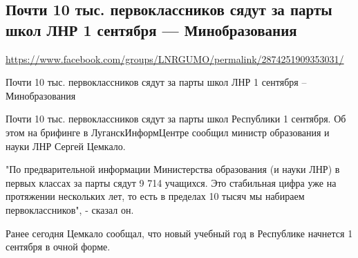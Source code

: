  
 
\subsection{Почти 10 тыс. первоклассников сядут за парты школ ЛНР 1 сентября --- Минобразования}
\label{sec:24_07_2020.fb.lnr.2}
\url{https://www.facebook.com/groups/LNRGUMO/permalink/2874251909353031/}

Почти 10 тыс. первоклассников сядут за парты школ ЛНР 1 сентября –
Минобразования

Почти 10 тыс. первоклассников сядут за парты школ Республики 1 сентября. Об
этом на брифинге в ЛуганскИнформЦентре сообщил министр образования и науки ЛНР
Сергей Цемкало.

"По предварительной информации Министерства образования (и науки ЛНР) в первых
классах за парты сядут 9 714 учащихся. Это стабильная цифра уже на протяжении
нескольких лет, то есть в пределах 10 тысяч мы набираем первоклассников", -
сказал он.

Ранее сегодня Цемкало сообщал, что новый учебный год в Республике начнется 1
сентября в очной форме.
  
